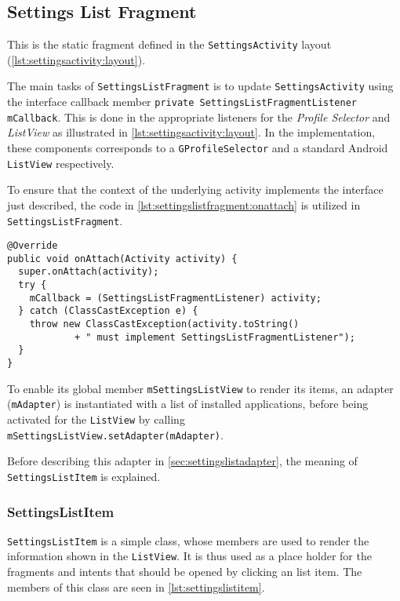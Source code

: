 \subsection{Settings List Fragment}\label{sec:settingslistfragment}
This is the static fragment defined in the \lstinline|SettingsActivity| layout (\cref{lst:settingsactivity:layout}).

The main tasks of \lstinline|SettingsListFragment| is to update \lstinline|SettingsActivity| using the interface callback member \lstinline|private SettingsListFragmentListener mCallback|.
This is done in the appropriate listeners for the \textit{Profile Selector} and \textit{ListView} as illustrated in \cref{lst:settingsactivity:layout}.
In the implementation, these components corresponds to a \lstinline|GProfileSelector| and a standard Android \lstinline|ListView| respectively.

To ensure that the context of the underlying activity implements the interface just described, the code in \cref{lst:settingslistfragment:onattach} is utilized in \lstinline|SettingsListFragment|.

\begin{lstlisting}[caption={Implementation to make sure the underlying activity implements the \lstinline|SettingsListFragmentListener| interface.}, label={lst:settingslistfragment:onattach}]
@Override
public void onAttach(Activity activity) {
  super.onAttach(activity);
  try {
    mCallback = (SettingsListFragmentListener) activity;
  } catch (ClassCastException e) {
    throw new ClassCastException(activity.toString()
            + " must implement SettingsListFragmentListener");
  }
}
\end{lstlisting}

To enable its global member \lstinline|mSettingsListView| to render its items, an adapter (\lstinline|mAdapter|) is instantiated with a list of installed applications, before being activated for the \lstinline|ListView| by calling \lstinline|mSettingsListView.setAdapter(mAdapter)|.

Before describing this adapter in \cref{sec:settingslistadapter}, the meaning of \lstinline|SettingsListItem| is explained.

\subsubsection{SettingsListItem}
\lstinline|SettingsListItem| is a simple class, whose members are used to render the information shown in the \lstinline|ListView|.
It is thus used as a place holder for the fragments and intents that should be opened by clicking an list item.
The members of this class are seen in \cref{lst:settingslistitem}.

